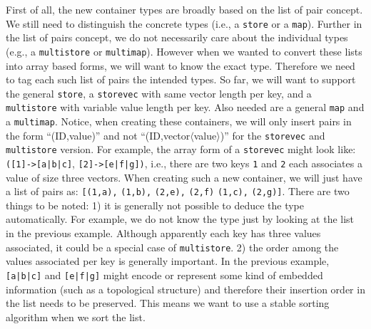 \documentclass{article}
\begin{document}
First of all, the new container types are broadly based on the list of
pair concept.  We still need to distinguish the concrete types (i.e., a
\texttt{store} or a \texttt{map}).  Further in the list of pairs
concept, we do not necessarily care about the individual types (e.g., a
\texttt{multistore} or \texttt{multimap}).  However when we wanted to
convert these lists into array based forms, we will want to know the
exact type.  Therefore we need to tag each such list of pairs the
intended types.  So far, we will want to support the general
\texttt{store}, a \texttt{storevec} with same vector length per key, and
a \texttt{multistore} with variable value length per key.  Also needed
are a general \texttt{map} and a \texttt{multimap}.  Notice, when
creating these containers, we will only insert pairs in the form
``(ID,value)'' and not ``(ID,vector$\langle$value$\rangle$)'' for the
\texttt{storevec} and \texttt{multistore} version.  For example, the
array form of a \texttt{storevec} might look like:
\texttt{([1]->[a|b|c]}, \texttt{[2]->[e|f|g])}, i.e., there are two keys
\texttt{1} and \texttt{2} each associates a value of size three vectors.
When creating such a new container, we will just have a list of pairs
as: \texttt{[(1,a),} \texttt{(1,b),} \texttt{(2,e),} \texttt{(2,f)}
\texttt{(1,c),} \texttt{(2,g)]}.  There are two things to be noted: 1)
it is generally not possible to deduce the type automatically.  For
example, we do not know the type just by looking at the list in the
previous example.  Although apparently each key has three values
associated, it could be a special case of \texttt{multistore}.  2) the
order among the values associated per key is generally important.  In
the previous example, \texttt{[a|b|c]} and \texttt{[e|f|g]} might encode
or represent some kind of embedded information (such as a topological
structure) and therefore their insertion order in the list needs to be
preserved.  This means we want to use a stable sorting algorithm when
we sort the list.
\end{document}

